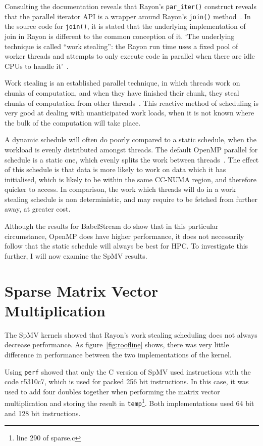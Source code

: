 Consulting the documentation reveals that Rayon's \texttt{par\_iter()} construct reveals that the parallel iterator API is a wrapper around Rayon's \texttt{join()} method~\cite{smallCult}. In the source code for \texttt{join()}, it is stated that the underlying implementation of join in Rayon is different to the common conception of it. 
`The underlying technique is called ``work stealing'': the
Rayon run time uses a fixed pool of worker threads and attempts to only execute code in parallel when there are idle CPUs to handle it'~\cite{joinSrc}.

Work stealing is an established parallel technique, in which threads work on chunks of computation, and when they have finished their chunk, they steal chunks of computation from other threads~\cite{blumofe1999}. This reactive method of scheduling is very good at dealing with unanticipated work loads, when it is not known where the bulk of the computation will take place.

A dynamic schedule will often do poorly compared to a static schedule, when the workload is evenly distributed amongst threads. The default OpenMP parallel for schedule is a static one, which evenly splits the work between threads~\cite{OpenMPSpec5}. The effect of this schedule is that data is more likely to work on data which it has initialised, which is likely to be within the same CC-NUMA region, and therefore quicker to access. In comparison, the work which threads will do in a work stealing schedule is non deterministic, and may require to be fetched from further away, at greater cost.

Although the results for BabelStream do show that in this particular circumstance, OpenMP does have higher performance, it does not necessarily follow that the static schedule will always be best for HPC\@. To investigate this further, I will now examine the SpMV results.

\section{Sparse Matrix Vector Multiplication}\label{sec:res-sparse}

The SpMV kernels showed that Rayon's work stealing scheduling does not always decrease performance. As figure~\ref{fig:roofline} shows, there was very little difference in performance between the two implementations of the kernel.

Using \texttt{perf} showed that only the C version of SpMV used instructions with the code r5310c7, which is used for packed 256 bit instructions. In this case, it was used to add four doubles together when performing the matrix vector multiplication and storing the result in \texttt{temp}\footnote{line 290 of sparse.c}. Both implementations used 64 bit and 128 bit instructions. 

